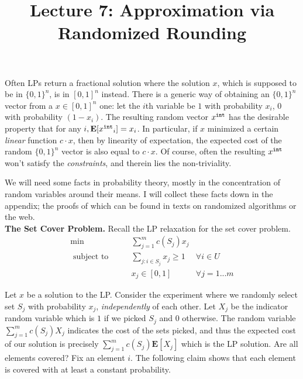 \documentclass[11pt]{article}
\begin{document}
\title{Lecture 7:  Approximation via Randomized Rounding }
\author{}
\date{}
\maketitle
\def\x{{x^{\tt int}}}
\def\E{{\mathbf E}}
\def\Pr{{\mathbf{Pr}}}

\noindent
Often LPs return a fractional solution where the solution $x$, which is supposed to be in $\{0,1\}^n$,
is in $[0,1]^n$ instead. There is a generic way of obtaining an $\{0,1\}^n$ vector from a $x \in [0,1]^n$ one: 
let the $i$th variable be $1$ with probability $x_i$, $0$ with probability $(1-x_i)$. The resulting random vector $\x$ has the desirable property that for any $i, \E[\x_i] = x_i$. In particular, if $x$ minimized a certain {\em linear}
function $c\cdot x$, then by linearity of expectation, the expected cost of the random $\{0,1\}^n$ vector is also equal to $c\cdot x$. Of course, often the resulting $\x$ won't satisfy the {\em constraints}, and therein lies the non-triviality.

We will need some facts in probability theory, mostly in the concentration of random variables around their means. I will collect these facts down in the appendix; the proofs of which can be found in texts on randomized algorithms or the web.  \\

\noindent
{\bf The Set Cover Problem.}
Recall the LP relaxation for the set cover problem.
\begin{align}
\min 				& \qquad \sum_{j=1}^m c(S_j)x_j	& \label{lp:setcover} \\
\textrm{ subject to}	& \qquad \sum_{j: i\in S_j} x_j \ge 1	& \forall i \in U \label{setcover:c1} \\
				& \qquad x_j \in [0,1] 			& \forall j = 1 ... m \label{setcover:c2}	
\end{align} 

\noindent
Let $x$ be a solution to the LP.
Consider the experiment where we randomly select set $S_j$ with probability $x_j$, {\em independently}
of each other. Let $X_j$ be the indicator random variable which is $1$ if we picked $S_j$ and $0$ otherwise.
The random variable $\sum_{j=1}^m c(S_j)X_j$ indicates the cost of the sets picked, 
and thus the expected cost of our solution is precisely $\sum_{j=1}^m c(S_j)\E[X_j]$ which is the LP solution. Are all elements covered? Fix an element $i$. 
The following claim shows that each element is covered with at least a constant probability.
\end{document}
